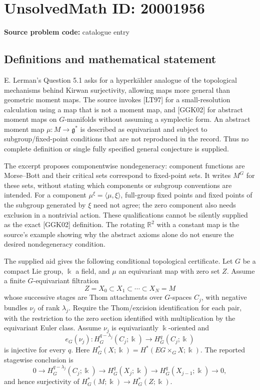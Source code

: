 \documentclass[11pt]{article}
\newcommand{\R}{\mathbb{R}}
\begin{document}
\section*{UnsolvedMath ID: 20001956}
\textbf{Source problem code:} catalogue entry
\subsection{Definitions and mathematical statement}
E. Lerman's Question 5.1 asks for a hyperkähler analogue of the topological mechanisms behind Kirwan surjectivity, allowing maps more general than geometric moment maps. The source invokes [LT97] for a small-resolution calculation using a map that is not a moment map, and [GGK02] for abstract moment maps on \(G\)-manifolds without assuming a symplectic form. An abstract moment map \(\mu:M\to\mathfrak g^*\) is described as equivariant and subject to subgroup/fixed-point conditions that are not reproduced in the record. Thus no complete definition or single fully specified general conjecture is supplied.

The excerpt proposes componentwise nondegeneracy: component functions are Morse--Bott and their critical sets correspond to fixed-point sets. It writes \(M^G\) for these sets, without stating which components or subgroup conventions are intended. For a component \(\mu^\xi=\langle\mu,\xi\rangle\), full-group fixed points and fixed points of the subgroup generated by \(\xi\) need not agree; the zero component also needs exclusion in a nontrivial action. These qualifications cannot be silently supplied as the exact [GGK02] definition. The rotating \(\R^2\) with a constant map is the source's example showing why the abstract axioms alone do not ensure the desired nondegeneracy condition.

The supplied aid gives the following conditional topological certificate. Let \(G\) be a compact Lie group, \(\Bbbk\) a field, and \(\mu\) an equivariant map with zero set \(Z\). Assume a finite \(G\)-equivariant filtration
\[
 Z=X_0\subset X_1\subset\cdots\subset X_N=M
\]
whose successive stages are Thom attachments over \(G\)-spaces \(C_j\), with negative bundles \(\nu_j\) of rank \(\lambda_j\). Require the Thom/excision identification for each pair, with the restriction to the zero section identified with multiplication by the equivariant Euler class. Assume \(\nu_j\) is equivariantly \(\Bbbk\)-oriented and
\[
 e_G(\nu_j):H_G^{q-\lambda_j}(C_j;\Bbbk)\longrightarrow H_G^q(C_j;\Bbbk)
\]
is injective for every \(q\). Here \(H_G^*(X;\Bbbk)=H^*(EG\times_GX;\Bbbk)\). The reported stagewise conclusion is
\[
 0\longrightarrow H_G^{q-\lambda_j}(C_j;\Bbbk)
 \longrightarrow H_G^q(X_j;\Bbbk)
 \longrightarrow H_G^q(X_{j-1};\Bbbk)\longrightarrow0,
\]
and hence surjectivity of \(H_G^*(M;\Bbbk)\to H_G^*(Z;\Bbbk)\).
\end{document}
